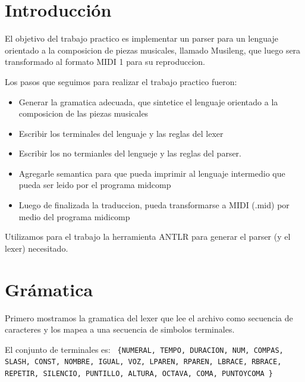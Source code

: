 \documentclass[a4paper]{article}
\begin{document}
\restoregeometry

\clearpage


\tableofcontents

\vspace{3cm}

\clearpage


\section{Introducción}
El objetivo del trabajo practico es implementar un parser para un lenguaje orientado a la composicion de piezas musicales, llamado Musileng, que luego sera transformado al formato MIDI 1 para su reproduccion.

Los pasos que seguimos para realizar el trabajo practico fueron:

\begin{itemize}
\item Generar la gramatica adecuada, que sintetice el lenguaje orientado a la composicion de las piezas musicales
\item Escribir los terminales del lenguaje y las reglas del lexer
\item Escribir los no termianles del lengueje y las reglas del parser.
\item Agregarle semantica para que pueda imprimir al lenguaje intermedio que pueda ser leido por el programa midcomp
\item Luego de finalizada la traduccion, pueda transformarse a MIDI (.mid) por medio del programa midicomp
\end{itemize}

Utilizamos para el trabajo la herramienta ANTLR para generar el parser (y el lexer) necesitado.


\section{Grámatica}

Primero mostramos la gramatica del lexer que lee el archivo como secuencia de caracteres y los mapea a una secuencia de simbolos terminales. 

El conjunto de terminales es: \texttt{
\{NUMERAL, TEMPO, DURACION, NUM, COMPAS, SLASH, CONST, NOMBRE, IGUAL, VOZ, LPAREN, RPAREN, LBRACE, RBRACE, REPETIR, SILENCIO, PUNTILLO, ALTURA, OCTAVA, COMA, PUNTOYCOMA \}
}\linebreak
\end{document}
